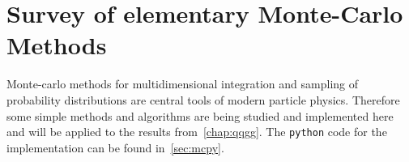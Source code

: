 
\chapter{Survey of elementary Monte-Carlo Methods}%
\label{chap:mc}

Monte-carlo methods for multidimensional integration and sampling of
probability distributions are central tools of modern particle
physics. Therefore some simple methods and algorithms are being
studied and implemented here and will be applied to the results
from~\ref{chap:qqgg}. The \verb|python| code for the implementation
can be found in~\ref{sec:mcpy}.
